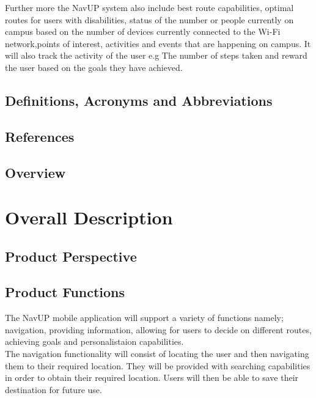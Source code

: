 \documentclass[11pt,a4paper]{article}
\begin{document}
 Further more the  NavUP system also include best route capabilities, optimal routes for users with disabilities, status of the number or people currently on campus based on the number of devices currently connected to the Wi-Fi network,points of interest, activities and events that are happening on campus. It will also track the activity of the user e.g The number of steps taken and reward the user based on the goals  they have achieved.

	\subsection{Definitions, Acronyms and Abbreviations}

	\subsection{References}


	\subsection{Overview}
		

\newpage
\section{Overall Description}
	\subsection{Product Perspective}
	\subsection{Product Functions}
	The NavUP mobile application will support a variety of functions namely; navigation, providing information, allowing for users to decide on different routes, achieving goals and personalistaion capabilities.
	\\

	The navigation functionality will consist of locating the user and then navigating them to their required location. They will be provided with searching capabilities in order to obtain their required location. Users will then be able to save their destination for future use.
	\\
\end{document}
